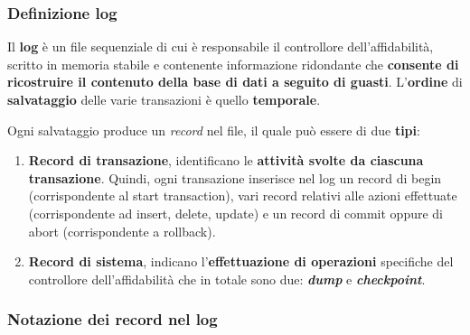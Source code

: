 \documentclass[a4paper]{article}
\begin{document}
	\subsubsection{Definizione log}
	
	Il \textcolor{Red3}{\textbf{log}} è un file sequenziale di cui è responsabile il controllore dell'affidabilità, scritto in memoria stabile e contenente informazione ridondante che \textbf{consente di ricostruire il contenuto della base di dati a seguito di guasti}. L'\textbf{ordine} di \textbf{salvataggio} delle varie transazioni è quello \textbf{temporale}.\newline
	
	\noindent
	Ogni salvataggio produce un \emph{record} nel file, il quale può essere di due \textbf{tipi}:
	\begin{enumerate}
		\item \textcolor{Red3}{\textbf{Record di transazione}}, identificano le \textbf{attività svolte da ciascuna transazione}. Quindi, ogni transazione inserisce nel log un record di \textsf{begin} (corrispondente al \textsf{start transaction}), vari record relativi alle azioni effettuate (corrispondente ad \textsf{insert}, \textsf{delete}, \textsf{update}) e un record di \textsf{commit} oppure di \textsf{abort} (corrispondente a \textsf{rollback}).
		
		\item \textcolor{Red3}{\textbf{Record di sistema}}, indicano l'\textbf{effettuazione di operazioni} specifiche del controllore dell'affidabilità che in totale sono due: \textbf{\emph{dump}} e \textbf{\emph{checkpoint}}.
	\end{enumerate}\newpage
	
	\subsubsection{Notazione dei record nel log}
	
\end{document}
